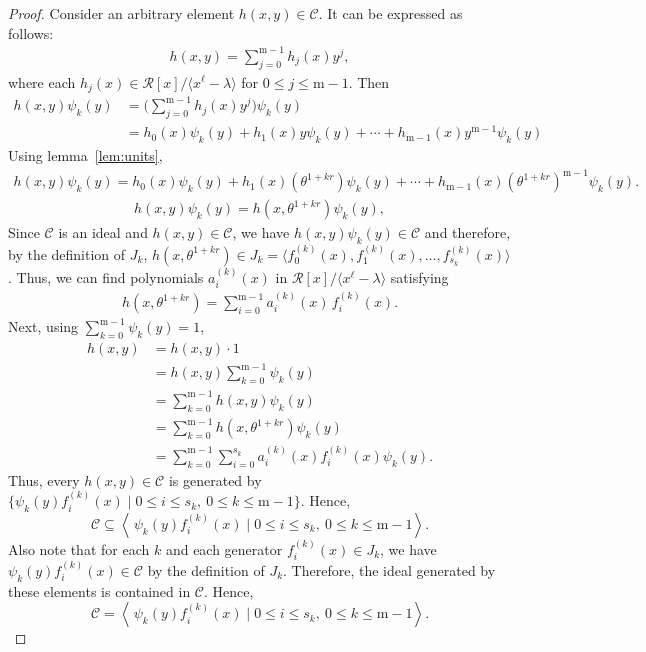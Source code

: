 \documentclass[10pt,a4paper]{amsart}
\begin{document}
\begin{proof}
Consider an arbitrary element $h(x,y)\in \mathscr{C}$. It can be expressed as follows:
\begin{align*}
    h(x,y)=\sum_{j=0}^{\mathrm{m}-1}h_j(x)y^j,
\end{align*}
where each $h_j(x)\in \mathcal{R}[x]/\langle x^{\ell}-\lambda\rangle$ for $0 \le j \le \mathrm{m}-1$. Then
\begin{align*}
h(x,y)\psi_k(y)&=\Big(\sum_{j=0}^{\mathrm{m}-1}h_j(x)y^j\Big)\psi_k(y)\\
&=h_0(x)\psi_k(y)+h_1(x)y\psi_k(y)+\cdots+h_{\mathrm{m}-1}(x)y^{\mathrm{m}-1}\psi_k(y)
\end{align*}
Using lemma~\ref{lem:units},
\begin{align*}
h(x,y)\psi_k(y)=h_0(x)\psi_k(y)+h_1(x)(\theta^{1+kr})\psi_k(y)+\cdots+h_{\mathrm{m}-1}(x)(\theta^{1+kr})^{\mathrm{m}-1}\psi_k(y).
\end{align*}
\begin{align*}
h(x,y)\psi_k(y)= h(x,\theta^{1+kr})\psi_k(y),
\end{align*}
Since $\mathscr{C}$ is an ideal and $h(x,y)\in\mathscr{C}$, we have
$h(x,y)\psi_k(y)\in\mathscr{C}$ and therefore, by the definition of $J_k$, $h(x,\theta^{1+kr}) \in J_k = \langle f_0^{(k)}(x),f_1^{(k)}(x), \dots , f_{s_k}^{(k)}(x) \rangle$. Thus, we can find polynomials $a_i^{(k)}(x)$ in
$\mathcal{R}[x]/\langle x^{\ell}-\lambda\rangle$ satisfying
\begin{align*}
h(x,\theta^{1+kr})=\sum_{i=0}^{\mathrm{m}-1} a_i^{(k)}(x)\,f_i^{(k)}(x).
\end{align*}
Next, using $\sum_{k=0}^{\mathrm{m}-1}\psi_k(y)=1$,
\begin{align*}
h(x,y) &=h(x,y)\cdot 1 \\
&=h(x,y)\sum_{k=0}^{\mathrm{m}-1}\psi_k(y)\\
&=\sum_{k=0}^{\mathrm{m}-1} h(x,y)\psi_k(y)\\
&=\sum_{k=0}^{\mathrm{m}-1} h(x,\theta^{1+kr})\psi_k(y)\\
&= \sum_{k=0}^{\mathrm{m}-1} \sum_{i=0}^{s_k} a_i^{(k)}(x)f_i^{(k)}(x)\psi_k(y).
\end{align*}
Thus, every $h(x,y)\in\mathscr{C}$ is generated by $\Big\{\psi_k(y)f_i^{(k)}(x) \mid 0 \le i \le s_k, \ 0\le k\le \mathrm{m}-1\Big\}$.
Hence,
\[
\mathscr{C}\subseteq
\left\langle\, \psi_k(y)f_i^{(k)}(x) \mid 0 \le i \le s_k, \ 0\le k\le \mathrm{m}-1\right\rangle.
\]
Also note that for each $k$ and each generator $f_i^{(k)}(x)\in J_k$,
we have $\psi_k(y)f_i^{(k)}(x)\in \mathscr{C}$ by the definition of $J_k$.
Therefore, the ideal generated by these elements is contained in $\mathscr{C}$. Hence,
\[
\mathscr{C} =
\left\langle\, \psi_k(y)f_i^{(k)}(x) \mid 0 \le i \le s_k, \ 0\le k\le \mathrm{m}-1\right\rangle.
\]

\end{proof}
\end{document}
